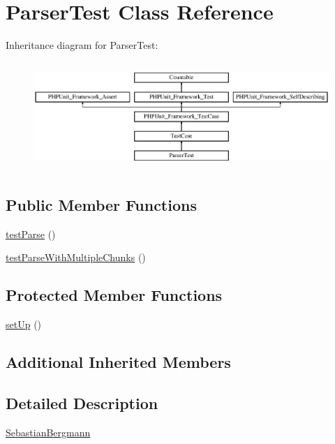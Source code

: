 \hypertarget{class_sebastian_bergmann_1_1_diff_1_1_parser_test}{}\section{Parser\+Test Class Reference}
\label{class_sebastian_bergmann_1_1_diff_1_1_parser_test}
Inheritance diagram for Parser\+Test\+:\begin{figure}[H]
\begin{center}
\leavevmode
\includegraphics[height=4.129793cm]{class_sebastian_bergmann_1_1_diff_1_1_parser_test}
\end{center}
\end{figure}
\subsection*{Public Member Functions}
\begin{DoxyCompactItemize}
\item 
\mbox{\hyperlink{class_sebastian_bergmann_1_1_diff_1_1_parser_test_aee18d5b983c5c5f663ae98732c55873c}{test\+Parse}} ()
\item 
\mbox{\hyperlink{class_sebastian_bergmann_1_1_diff_1_1_parser_test_a849e8338c68d6721c854844713388ede}{test\+Parse\+With\+Multiple\+Chunks}} ()
\end{DoxyCompactItemize}
\subsection*{Protected Member Functions}
\begin{DoxyCompactItemize}
\item 
\mbox{\hyperlink{class_sebastian_bergmann_1_1_diff_1_1_parser_test_a0bc688732d2b3b162ffebaf7812e78da}{set\+Up}} ()
\end{DoxyCompactItemize}
\subsection*{Additional Inherited Members}


\subsection{Detailed Description}
\mbox{\hyperlink{namespace_sebastian_bergmann}{Sebastian\+Bergmann}}

